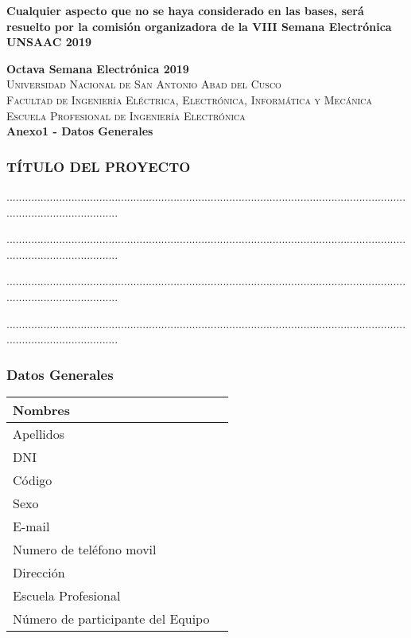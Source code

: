 \documentclass{article}
\begin{document}
\textbf{Cualquier aspecto que no se haya considerado en las bases, será resuelto por la comisión 
organizadora de la VIII Semana Electrónica UNSAAC 2019}

\newpage
{\center
{\Huge \bfseries Octava Semana Electrónica 2019} \\ [0.4cm]
\textsc{\LARGE  Universidad Nacional de San Antonio Abad del Cusco}\\[0.4cm] 
\textsc{\Large Facultad de Ingeniería Eléctrica, Electrónica, Informática y Mecánica}\\[0.4cm] 
\textsc{\large Escuela Profesional de Ingeniería Electrónica}\\[0.4cm]
{ \bfseries Anexo1 - Datos Generales}}

\subsubsection{TÍTULO DEL PROYECTO}

.....................................................................................................................................................................

.....................................................................................................................................................................

.....................................................................................................................................................................

.....................................................................................................................................................................


\subsubsection{Datos Generales}

\begin{tabular}{|p{5cm}|p{10cm}|}
\hline
Nombres & \\ \hline
Apellidos & \\ \hline
DNI & \\ \hline
Código & \\ \hline
Sexo & \\ \hline
E-mail & \\ \hline
Numero de teléfono movil & \\ \hline
Dirección & \\ \hline
Escuela Profesional & \\ \hline
Número de participante del Equipo & \\ \hline
\end{tabular}
\end{document}
